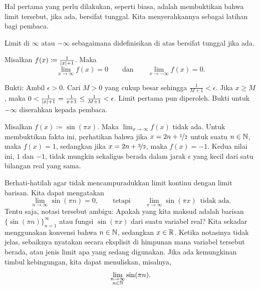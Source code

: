 Hal pertama yang perlu dilakukan, seperti biasa, adalah membuktikan bahwa limit tersebut, jika ada,
bersifat tunggal.
Kita menyerahkannya sebagai latihan bagi pembaca.

\begin{prop} \label{liminfty:unique}
Limit di $\infty$ atau $-\infty$ sebagaimana didefinisikan di atas bersifat tunggal jika ada.
\end{prop}

\begin{example}
Misalkan $f(x) \coloneqq \frac{1}{\lvert {x} \rvert+1}$.  Maka
\begin{equation*}
\lim_{x\to \infty} f(x) = 0 \qquad \text{dan} \qquad
\lim_{x\to -\infty} f(x) = 0 .
\end{equation*}

Bukti:
Ambil $\epsilon > 0$.  Cari $M > 0$ yang cukup besar
sehingga $\frac{1}{M+1} < \epsilon$.  Jika
$x \geq M$, maka $0 < \frac{1}{\lvert {x} \rvert+1} = \frac{1}{x+1} \leq \frac{1}{M+1} < \epsilon$.
Limit pertama pun diperoleh.
Bukti untuk $-\infty$ diserahkan kepada pembaca.
\end{example}

\begin{example}
Misalkan $f(x) \coloneqq \sin(\pi x)$.  Maka $\lim_{x\to\infty} f(x)$ tidak ada.
Untuk membuktikan fakta ini, perhatikan bahwa jika $x = 2n+\nicefrac{1}{2}$ untuk suatu $n \in
{\mathbb{N}}$, maka $f(x)=1$,
sedangkan jika $x = 2n+\nicefrac{3}{2}$, maka $f(x)=-1$.
Kedua nilai ini, $1$ dan $-1$, tidak mungkin sekaligus berada
dalam jarak $\epsilon$ yang kecil dari satu bilangan real yang sama.

Berhati-hatilah agar tidak mencampuradukkan limit kontinu dengan limit barisan.
Kita dapat mengatakan
\begin{equation*}
\lim_{n \to \infty} \sin(\pi n) = 0, \qquad \text{tetapi} \qquad
\lim_{x \to \infty} \sin(\pi x) \enspace \text{tidak ada}.
\end{equation*}
Tentu saja, notasi tersebut ambigu:  Apakah yang kita maksud adalah
barisan $\bigl\{ \sin (\pi n) \bigr\}_{n=1}^\infty$ atau fungsi $\sin(\pi x)$
dari suatu variabel real?  Kita sekadar menggunakan konvensi
bahwa $n \in {\mathbb{N}}$, sedangkan $x \in {\mathbb{R}}$.  Ketika notasinya tidak jelas,
sebaiknya nyatakan secara eksplisit di himpunan mana variabel tersebut berada, atau jenis
limit apa yang sedang digunakan.  Jika ada kemungkinan timbul kebingungan, kita dapat
menuliskan, misalnya,
\begin{equation*}
\lim_{\substack{n \to \infty\\n \in {\mathbb{N}}}} \sin(\pi n) .
\end{equation*}
\end{example}

